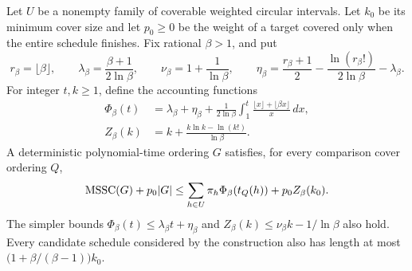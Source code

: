 \begin{lemma}\label{lem:mssc}
Let $U$ be a nonempty family of coverable weighted circular intervals.
Let $k_0$ be its minimum cover size and let $p_0\ge0$ be the weight
of a target covered only when the entire schedule finishes.
Fix rational $\beta>1$, and put
\[
 r_\beta=\lfloor\beta\rfloor,\qquad
 \lambda_\beta=\frac{\beta+1}{2\ln\beta},\qquad
 \nu_\beta=1+\frac1{\ln\beta},\qquad
 \eta_\beta=\frac{r_\beta+1}{2}
            -\frac{\ln(r_\beta!)}{2\ln\beta}-\lambda_\beta.
\]
For integer $t,k\ge1$, define the accounting functions
\[
 \begin{aligned}
 \Phi_\beta(t)
 &=\lambda_\beta+\eta_\beta
    +\frac1{2\ln\beta}\int_1^t
       \frac{\lfloor x\rfloor+\lfloor\beta x\rfloor}{x}\,dx,\\
 Z_\beta(k)
 &=k+\frac{k\ln k-\ln(k!)}{\ln\beta}.
 \end{aligned}
\]
A deterministic polynomial-time ordering $G$ satisfies, for every
comparison cover ordering $Q$,
\[
 \operatorname{MSSC}(G)+p_0|G|
 \le\sum_{h\in U}\pi_h\Phi_\beta(t_Q(h))+p_0 Z_\beta(k_0).
\]
The simpler bounds
$\Phi_\beta(t)\le\lambda_\beta t+\eta_\beta$ and
$Z_\beta(k)\le\nu_\beta k-1/\ln\beta$ also hold.
Every candidate schedule considered by the construction also has
length at most $\bigl(1+\beta/(\beta-1)\bigr)k_0$.
\end{lemma}
